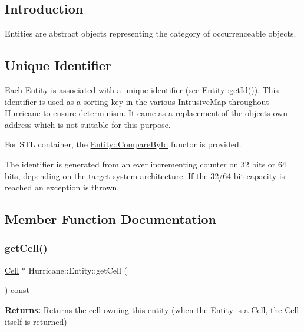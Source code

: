 \hypertarget{classHurricane_1_1Entity_secEntityIntro}{}\subsection{Introduction}\label{classHurricane_1_1Entity_secEntityIntro}
Entities are abstract objects representing the category of occurrenceable objects.\hypertarget{classHurricane_1_1Entity_secEntityId}{}\subsection{Unique Identifier}\label{classHurricane_1_1Entity_secEntityId}
Each \mbox{\hyperlink{classHurricane_1_1Entity}{Entity}} is associated with a unique identifier (see Entity\+::get\+Id()). This identifier is used as a sorting key in the various Intrusive\+Map throughout \mbox{\hyperlink{namespaceHurricane}{Hurricane}} to ensure determinism. It came as a replacement of the object\textquotesingle{}s own address which is not suitable for this purpose.

For S\+TL container, the \mbox{\hyperlink{classEntity_1_1CompareById}{Entity\+::\+Compare\+By\+Id}} functor is provided.

The identifier is generated from an ever incrementing counter on 32 bits or 64 bits, depending on the target system architecture. If the 32/64 bit capacity is reached an exception is thrown. 

\subsection{Member Function Documentation}
\mbox{\label{classHurricane_1_1Entity_a42bdf015f583be477cc54b48652b1007}} 
\subsubsection{\texorpdfstring{get\+Cell()}{getCell()}}
{\footnotesize\ttfamily \mbox{\hyperlink{classHurricane_1_1Cell}{Cell}} $\ast$ Hurricane\+::\+Entity\+::get\+Cell (\begin{DoxyParamCaption}{ }\end{DoxyParamCaption}) const\hspace{0.3cm}{\ttfamily [pure virtual]}}

{\bfseries Returns\+:} Returns the cell owning this entity (when the \mbox{\hyperlink{classHurricane_1_1Entity}{Entity}} is a \mbox{\hyperlink{classHurricane_1_1Cell}{Cell}}, the \mbox{\hyperlink{classHurricane_1_1Cell}{Cell}} itself is returned) \mbox{\label{classHurricane_1_1Entity_ad834f8ce33a08a13e2a88446696e63e7}} 
